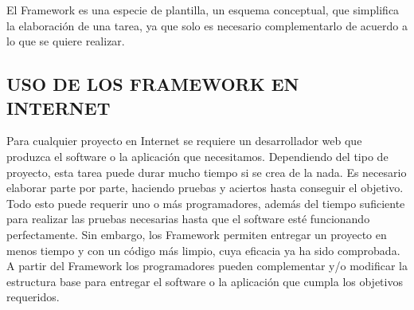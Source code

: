 
El Framework es una especie de plantilla, un esquema conceptual, que simplifica la elaboración de una tarea, ya que solo es necesario complementarlo de acuerdo a lo que se quiere realizar. \cite{Frame}

\subsection{USO DE LOS FRAMEWORK EN INTERNET}

Para cualquier proyecto en Internet se requiere un desarrollador web que produzca el software o la aplicación que necesitamos.
Dependiendo del tipo de proyecto, esta tarea puede durar mucho tiempo si se crea de la nada. Es necesario elaborar parte por parte, haciendo pruebas y aciertos hasta conseguir el objetivo.
Todo esto puede requerir uno o más programadores, además del tiempo suficiente para realizar las pruebas necesarias hasta que el software esté funcionando perfectamente.
Sin embargo, los Framework permiten entregar un proyecto en menos tiempo y con un código más limpio, cuya eficacia ya ha sido comprobada.
A partir del Framework los programadores pueden complementar y/o modificar la estructura base para entregar el software o la aplicación que cumpla los objetivos requeridos.\cite{Frame}